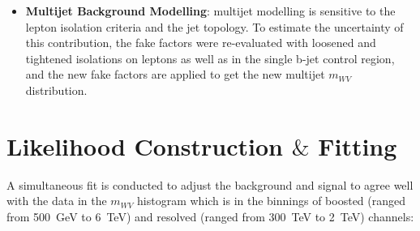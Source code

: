 \begin{itemize}
	\item{\bf Multijet Background Modelling}: multijet modelling is sensitive to the lepton isolation criteria and the jet topology. To estimate the uncertainty of this contribution, the fake factors were re-evaluated with loosened and tightened isolations on leptons as well as in the single b-jet control region, and the new fake factors are applied to get the new multijet $m_{WV}$ distribution.
\end{itemize}
\section{Likelihood Construction $\&$ Fitting}
A simultaneous fit is conducted to adjust the background and signal to agree well with the data in the $m_{WV}$ histogram which is in the binnings of boosted (ranged from 500~GeV to 6~TeV) and resolved (ranged from 300~TeV to 2~TeV) channels:

